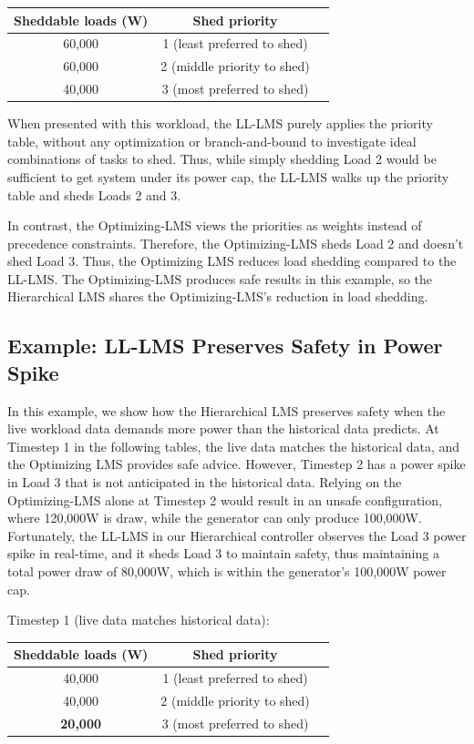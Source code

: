 \documentclass{acm_proc_article-sp}
\begin{document}
\begin{tabular}{c|cc}
Sheddable loads (W) & Shed priority \\ \hline
60,000 & 1 (least preferred to shed) \\
60,000 & 2 (middle priority to shed) \\ 
40,000 & 3 (most preferred to shed) \\ \hline
\end{tabular}

When presented with this workload, the LL-LMS purely applies the priority table, without any optimization or branch-and-bound to investigate ideal combinations of tasks to shed. 
Thus, while simply shedding Load 2 would be sufficient to get system under its power cap, the LL-LMS walks up the priority table and sheds Loads 2 and 3.

In contrast, the Optimizing-LMS views the priorities as weights instead of precedence constraints. 
Therefore, the Optimizing-LMS sheds Load 2 and doesn't shed Load 3. 
Thus, the Optimizing LMS reduces load shedding compared to the LL-LMS.
The Optimizing-LMS produces safe results in this example, so the Hierarchical LMS shares the Optimizing-LMS's reduction in load shedding.

\subsection{Example: LL-LMS Preserves Safety in Power Spike}
In this example, we show how the Hierarchical LMS preserves safety when the live workload data demands more power than the historical data predicts. 
At Timestep 1 in the following tables, the live data matches the historical data, and the Optimizing LMS provides safe advice.
However, Timestep 2 has a power spike in Load 3 that is not anticipated in the historical data. 
Relying on the Optimizing-LMS alone at Timestep 2 would result in an unsafe configuration, where 120,000W is draw, while the generator can only produce 100,000W.
Fortunately, the LL-LMS in our Hierarchical controller observes the Load 3 power spike in real-time, and it sheds Load 3 to maintain safety, thus maintaining a total power draw of 80,000W, which is within the generator's 100,000W power cap.

Timestep 1 (live data matches historical data):\\
\begin{tabular}{c|cc}
Sheddable loads (W) & Shed priority \\ \hline
40,000 & 1 (least preferred to shed) \\
40,000 & 2 (middle priority to shed) \\ 
{\bf 20,000} & 3 (most preferred to shed) \\ \hline
\end{tabular}
\end{document}
